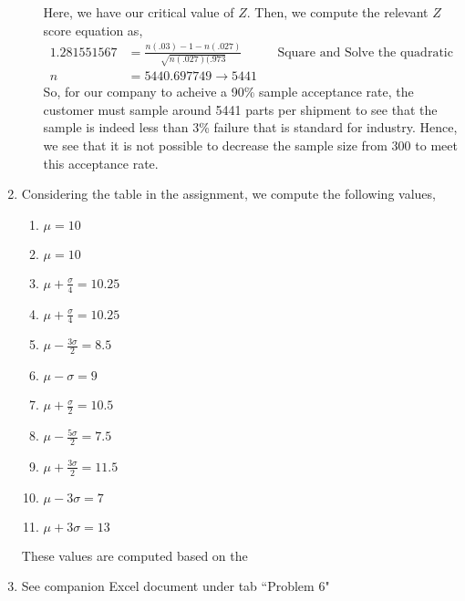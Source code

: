 \documentclass[letterpaper,10pt]{article}
\begin{document}
\begin{enumerate}
\begin{enumerate}
Here, we have our critical value of $Z$. Then, we compute the relevant $Z$ score equation as,
\begin{align*}
1.281551567 &= \frac{n(.03)-1-n(.027)}{\sqrt{n(.027)(.973}} &&\text{Square and Solve the quadratic}\\
n &= 5440.697749 \to 5441
\end{align*}
So, for our company to acheive a 90\% sample acceptance rate, the customer must sample around 5441 parts per shipment to see that the sample is indeed less than 3\% failure that is standard for industry. Hence, we see that it is not possible to decrease the sample size from 300 to meet this acceptance rate. 
\end{enumerate} 
\item Considering the table in the assignment, we compute the following values,
\begin{enumerate}[label=\alph*.]
\item $\mu=10$
\item $\mu=10$
\item $\mu+\frac{\sigma}{4}=10.25$
\item $\mu+\frac{\sigma}{4}=10.25$
\item $\mu-\frac{3\sigma}{2}=8.5$
\item $\mu-\sigma=9$
\item $\mu+\frac{\sigma}{2}=10.5$
\item $\mu-\frac{5\sigma}{2}=7.5$
\item $\mu+\frac{3\sigma}{2}=11.5$
\item $\mu-3\sigma=7$
\item $\mu+3\sigma=13$
\end{enumerate}
These values are computed based on the 
\item See companion Excel document under tab ``Problem 6"
\end{enumerate}
\end{document}
